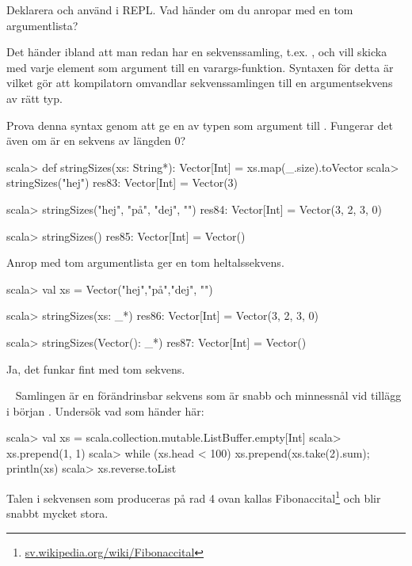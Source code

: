 \Subtask Deklarera och använd  i REPL. Vad händer om du anropar  med en tom argumentlista?

\Subtask Det händer ibland att man redan har en sekvenssamling, t.ex. , och vill skicka med varje element som argument till en varargs-funktion. Syntaxen för detta är  vilket gör att kompilatorn omvandlar sekvenssamlingen till en argumentsekvens av rätt typ.

Prova denna syntax genom att ge en  av typen  som argument till . Fungerar det även om  är en sekvens av längden 0?

\SOLUTION

\TaskSolved \what

\SubtaskSolved

\begin{REPL}
scala> def stringSizes(xs: String*): Vector[Int] = xs.map(_.size).toVector
scala> stringSizes("hej")
res83: Vector[Int] = Vector(3)

scala> stringSizes("hej", "på", "dej", "")
res84: Vector[Int] = Vector(3, 2, 3, 0)

scala> stringSizes()
res85: Vector[Int] = Vector()
\end{REPL}

\noindent Anrop med tom argumentlista ger en tom heltalssekvens.

\SubtaskSolved

\begin{REPL}
scala> val xs = Vector("hej","på","dej", "")

scala> stringSizes(xs: _*)
res86: Vector[Int] = Vector(3, 2, 3, 0)

scala> stringSizes(Vector(): _*)
res87: Vector[Int] = Vector()
\end{REPL}
Ja, det funkar fint med tom sekvens.



\QUESTEND




\QUESTBEGIN

\Task  \what~ Samlingen  är en förändrinsbar sekvens som är snabb och minnessnål vid tillägg i början . Undersök vad som händer här:
\begin{REPL}
scala> val xs = scala.collection.mutable.ListBuffer.empty[Int]
scala> xs.prepend(1, 1)
scala> while (xs.head < 100) {xs.prepend(xs.take(2).sum); println(xs)}
scala> xs.reverse.toList
\end{REPL}
Talen i sekvensen som produceras på rad 4 ovan kallas Fibonaccital\footnote{\href{https://sv.wikipedia.org/wiki/Fibonaccital}{sv.wikipedia.org/wiki/Fibonaccital}} och blir snabbt mycket stora.

